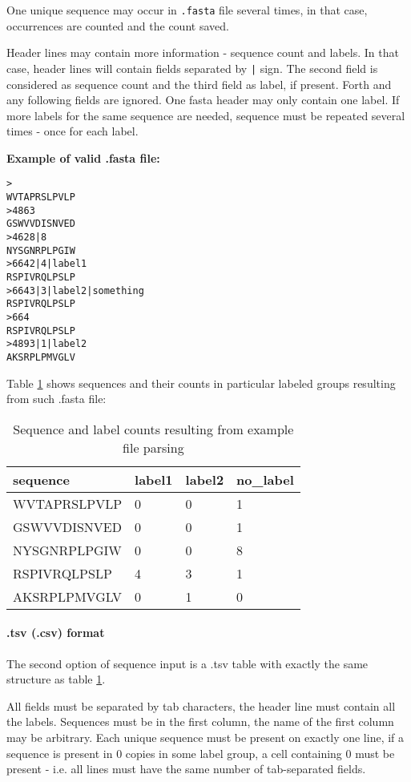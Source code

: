 \documentclass[11pt, a4paper, twoside, titlepage]{article}
\begin{document}
One unique sequence may occur in \texttt{.fasta} file several times, in that case, occurrences are counted and the count saved. 

Header lines may contain more information - sequence count and labels. In that case, header lines will contain fields separated by \texttt{|} sign. The second field is considered as sequence count and the third field as label, if present. Forth and any following fields are ignored. One fasta header may only contain one label. If more labels for the same sequence are needed, sequence must be repeated several times - once for each label.  \newline 

\textbf{Example of valid .fasta file:} 

\begin{verbatim}
>
WVTAPRSLPVLP
>4863
GSWVVDISNVED
>4628|8
NYSGNRPLPGIW
>6642|4|label1
RSPIVRQLPSLP
>6643|3|label2|something
RSPIVRQLPSLP
>664
RSPIVRQLPSLP
>4893|1|label2
AKSRPLPMVGLV
\end{verbatim}

Table \ref{tab1} shows sequences and their counts in particular labeled groups resulting from such .fasta file: 

\begin{table}[h]
\begin{tabular}{|l|l|l|l|}
\hline
sequence     & label1 & label2 & no\_label \\ \hline
WVTAPRSLPVLP & 0      & 0      & 1         \\
GSWVVDISNVED & 0      & 0      & 1         \\
NYSGNRPLPGIW & 0      & 0      & 8         \\
RSPIVRQLPSLP & 4      & 3      & 1         \\
AKSRPLPMVGLV & 0      & 1      & 0         \\ \hline
\end{tabular}
\label{tab1}
\caption{Sequence and label counts resulting from example file parsing}
\end{table}


\paragraph{.tsv (.csv) format}
The second option of sequence input is a .tsv table with exactly the same structure as table \ref{tab1}.

All fields must be separated by tab characters, the header line must contain all the labels. Sequences must be in the first column, the name of the first column may be arbitrary. Each unique sequence must be present on exactly one line, if a sequence is present in 0 copies in some label group, a cell containing 0 must be present - i.e. all lines must have the same number of tab-separated fields. \newline
\end{document}
